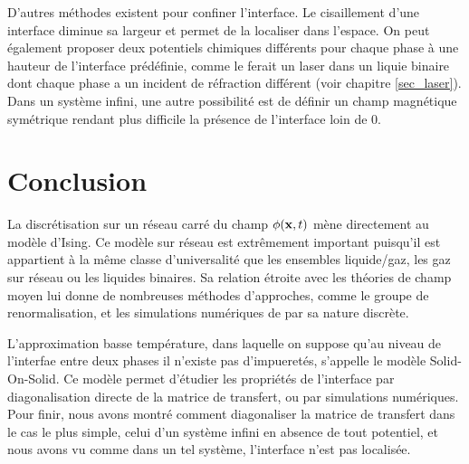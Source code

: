D'autres méthodes existent pour confiner l'interface. Le cisaillement d'une interface diminue sa largeur et permet de la localiser dans l'espace. On peut également proposer deux potentiels chimiques différents pour chaque phase à une hauteur de l'interface prédéfinie, comme le ferait un laser dans un liquie binaire dont chaque phase  a un incident de réfraction différent \cite{casner_laser-induced_2003,delville_laser_2009} (voir chapitre \ref{sec_laser}). Dans un système infini, une autre possibilité est de définir un champ magnétique symétrique rendant plus difficile la présence de l'interface loin de $0$. 

\section{Conclusion}

La discrétisation sur un réseau carré du champ $\phi({\bf x},t)$ mène directement au modèle d'Ising. Ce modèle sur réseau est extrêmement important puisqu'il est appartient à la même classe d'universalité que les ensembles liquide/gaz, les gaz sur réseau ou les liquides binaires. Sa relation étroite avec les théories de champ moyen lui donne de nombreuses méthodes d'approches, comme le groupe de renormalisation, et les simulations numériques de par sa nature discrète. 

L'approximation basse température, dans laquelle on suppose qu'au niveau de l'interfae entre deux phases il n'existe pas d'impueretés, s'appelle le modèle Solid-On-Solid. Ce modèle permet d'étudier les propriétés de l'interface par diagonalisation directe de la matrice de transfert, ou par simulations numériques. 
Pour finir, nous avons montré comment diagonaliser la matrice de transfert dans le cas le plus simple, celui d'un système infini en absence de tout potentiel, et nous avons vu comme dans un tel système, l'interface n'est pas localisée.
